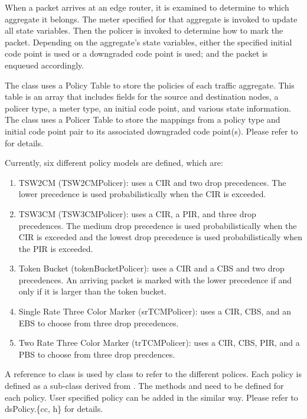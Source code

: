 When a packet arrives at an edge router, it is examined to determine to which 
aggregate it belongs.  The meter specified for that aggregate is invoked to 
update all state variables.  Then the policer is invoked to determine how to 
mark the packet.  Depending on the aggregate's state variables, either the 
specified initial code point is used or a downgraded code point is used; and 
the packet is enqueued accordingly.

The  class uses a Policy Table to store the policies of each 
traffic aggregate.  This table is an array that includes fields for the 
source and destination nodes, a policer type, a meter type, an initial code 
point, and various state information. 
The  class uses a Policer Table to store the mappings from 
a policy type and initial code point pair to its associated downgraded code 
point(s).  
Please refer to  for details. 

Currently, six different policy models are defined, which are:
\begin{enumerate}
\item
TSW2CM (TSW2CMPolicer): uses a CIR and two drop precedences.  
The lower precedence is used probabilistically when the CIR is exceeded.
\item
TSW3CM (TSW3CMPolicer): uses a CIR, a PIR, and three drop precedences.  
The medium drop precedence is used probabilistically when the CIR is exceeded 
and the lowest drop precedence is used probabilistically when the PIR is 
exceeded.
\item
Token Bucket (tokenBucketPolicer): uses a CIR and a CBS and two drop 
precedences.  An arriving packet is marked with the lower precedence if and 
only if it is larger than the token bucket.
\item
Single Rate Three Color Marker (srTCMPolicer): uses a CIR, CBS, and an EBS to 
choose from three drop precedences.
\item
Two Rate Three Color Marker (trTCMPolicer): uses a CIR, CBS, PIR, and a PBS to
choose from three drop precdences.
\end{enumerate}

A reference to class  is used by class 
to refer to the different polices.
Each policy is defined as a sub-class derived from .
The methods  and  need to be defined for 
each policy. User specified policy can be added in the similar way.
Please refer to {dsPolicy.\{cc, h\}} for details.

